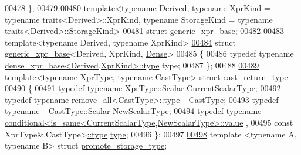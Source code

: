 \begin{DoxyCode}
{00478 \};
00479 
00480 template<typename Derived, typename XprKind = typename traits<Derived>::XprKind, \textcolor{keyword}{typename} StorageKind = \textcolor{keyword}{
      typename} \hyperlink{struct_eigen_1_1internal_1_1traits}{traits<Derived>::StorageKind}>
\hyperlink{struct_eigen_1_1internal_1_1generic__xpr__base}{00481} \textcolor{keyword}{struct }\hyperlink{struct_eigen_1_1internal_1_1generic__xpr__base}{generic\_xpr\_base};
00482 
00483 \textcolor{keyword}{template}<\textcolor{keyword}{typename} Derived, \textcolor{keyword}{typename} XprKind>
\hyperlink{struct_eigen_1_1internal_1_1generic__xpr__base_3_01_derived_00_01_xpr_kind_00_01_dense_01_4}{00484} \textcolor{keyword}{struct }\hyperlink{struct_eigen_1_1internal_1_1generic__xpr__base}{generic\_xpr\_base}<Derived, XprKind, \hyperlink{struct_eigen_1_1_dense}{Dense}>
00485 \{
00486   \textcolor{keyword}{typedef} \textcolor{keyword}{typename} \hyperlink{struct_eigen_1_1internal_1_1dense__xpr__base}{dense\_xpr\_base<Derived,XprKind>::type} type;
00487 \};
00488 
\hyperlink{struct_eigen_1_1internal_1_1cast__return__type}{00489} \textcolor{keyword}{template}<\textcolor{keyword}{typename} XprType, \textcolor{keyword}{typename} CastType> \textcolor{keyword}{struct }\hyperlink{struct_eigen_1_1internal_1_1cast__return__type}{cast\_return\_type}
00490 \{
00491   \textcolor{keyword}{typedef} \textcolor{keyword}{typename} XprType::Scalar CurrentScalarType;
00492   \textcolor{keyword}{typedef} \textcolor{keyword}{typename} \hyperlink{group___sparse_core___module}{remove\_all<CastType>::type} 
      \hyperlink{group___sparse_core___module}{\_CastType};
00493   \textcolor{keyword}{typedef} \textcolor{keyword}{typename} \_CastType::Scalar NewScalarType;
00494   \textcolor{keyword}{typedef} \textcolor{keyword}{typename} \hyperlink{struct_eigen_1_1internal_1_1conditional}{conditional<is\_same<CurrentScalarType,NewScalarType>::value}
      ,
00495                               \textcolor{keyword}{const} XprType&,CastType>\hyperlink{class_eigen_1_1internal_1_1_tensor_lazy_evaluator_writable}{::type} \hyperlink{class_eigen_1_1internal_1_1_tensor_lazy_evaluator_writable}{type};
00496 \};
00497 
\hyperlink{struct_eigen_1_1internal_1_1promote__storage__type}{00498} \textcolor{keyword}{template} <\textcolor{keyword}{typename} A, \textcolor{keyword}{typename} B> \textcolor{keyword}{struct }\hyperlink{struct_eigen_1_1internal_1_1promote__storage__type}{promote\_storage\_type};
}
\end{DoxyCode}
